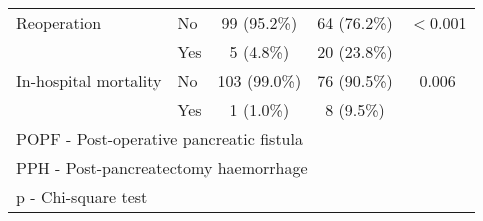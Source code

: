 \begin{table}[p]
\begin{tabular}{|l l c c c|}
		Reoperation              & No            & 99 (95.2\%)  & 64 (76.2\%)                 & $<$0.001   \\
		                         & Yes           & 5 (4.8\%)    & 20 (23.8\%)                 &  \\
		In-hospital mortality    & No            & 103 (99.0\%) & 76 (90.5\%)                 & 0.006      \\
		                         & Yes           & 1 (1.0\%)    & 8 (9.5\%)                   &  \\ \hline
		\multicolumn{5}{l}{POPF - Post-operative pancreatic fistula}                                       \\
		\multicolumn{5}{l}{PPH - Post-pancreatectomy haemorrhage}                                          \\
		\multicolumn{5}{l}{p - Chi-square test}
	\end{tabular}
\end{table}
